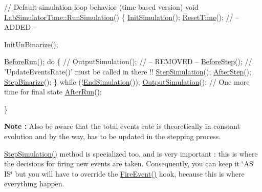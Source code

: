 \begin{DoxyCode}
\textcolor{comment}{// Default simulation loop behavior (time based version)}
\textcolor{keywordtype}{void} \hyperlink{classelps_1_1_lab_simulator_time_a9cf1c9a315d192ea8c065389788fd2c5}{LabSimulatorTime::RunSimulation}()
\{
        \hyperlink{classelps_1_1_lab_simulator_base_aa14aa05df8173ffd2a2e67aa25f3cea5}{InitSimulation}();
        \hyperlink{classelps_1_1_lab_simulator_time_ad2f79a788d88d06558e17ce65a89f769}{ResetTime}();                    \textcolor{comment}{// -- ADDED --}

        \hyperlink{classelps_1_1_lab_simulator_base_a1339bc2fd37e7a4cc5c8792f447bf348}{InitUnBinarize}();

        \hyperlink{classelps_1_1_lab_simulator_base_abf0012f53b199184d9359656f2f9e4e1}{BeforeRun}();
        \textcolor{keywordflow}{do}
        \{
                \textcolor{comment}{// OutputSimulation();      // -- REMOVED --}
                \hyperlink{classelps_1_1_lab_simulator_base_a51232753515304871678d22aea555a8b}{BeforeStep}();               \textcolor{comment}{// 'UpdateEventsRate()' must be called in there !!}
                \hyperlink{classelps_1_1_lab_simulator_time_ad8845591018d7d9bdf38932faa2a04dd}{StepSimulation}();
                \hyperlink{classelps_1_1_lab_simulator_base_ad00284fc35dec38e6933a37858cb72c6}{AfterStep}();
                \hyperlink{classelps_1_1_lab_simulator_base_ac1dcb0ae906c0e729a31172a02c243e2}{StepBinarize}();
        \}
        \textcolor{keywordflow}{while} (!\hyperlink{classelps_1_1_lab_simulator_time_ada8cfaa732adce02ebe8d8f59d758257}{EndSimulation}());
        \hyperlink{classelps_1_1_lab_simulator_base_ac0c49279bf16f19b4f8fbd856e3fc6d6}{OutputSimulation}();             \textcolor{comment}{// One more time for final state}
        \hyperlink{classelps_1_1_lab_simulator_base_afbd964545df8788fe65a488e731a7d05}{AfterRun}();

\}
\end{DoxyCode}


{\bfseries Note \+:} Also be aware that the total events rate is theoretically in constant evolution and by the way, has to be updated in the stepping process.

\hyperlink{classelps_1_1_lab_simulator_time_ad8845591018d7d9bdf38932faa2a04dd}{Step\+Simulation()} method is specialized too, and is very important \+: this is where the decisions for firing new events are taken. Consequently, you can keep it \char`\"{}\+A\+S I\+S\char`\"{} but you will have to override the \hyperlink{classelps_1_1_lab_simulator_time_a6ed55e9c17248459dfa5c6ab9caee7f5}{Fire\+Event()} hook, because this is where everything happen.

